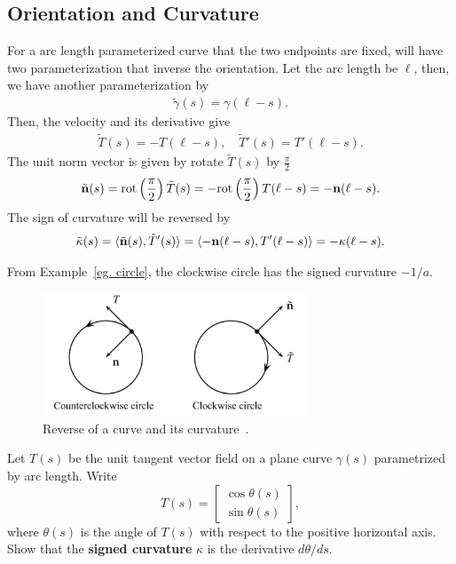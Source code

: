 \subsection{Orientation and Curvature}
For a arc length parameterized curve that the two endpoints are fixed, 
will have two parameterization that inverse the orientation. Let the arc length be $\ell$,
then, we have another parameterization by
\begin{align}
    \tilde{\gamma}(s)=\gamma(\ell - s). \nonumber
\end{align}
Then, the velocity and its derivative give
\begin{align}
    \tilde{T}(s)=-T(\ell - s), \quad \tilde{T}'(s)=T'(\ell - s). \nonumber
\end{align}
The unit norm vector is given by rotate $\tilde{T}(s)$ by $\frac{\pi}{2}$
\begin{align}
    \tilde{{\mathbf{n}}}(s)=\text{rot}\left(\frac{\pi}{2}\right)\tilde{T}(s)
    =-\text{rot}\left(\frac{\pi}{2}\right)T(\ell - s)=-{\mathbf{n}}(\ell - s). \nonumber
\end{align}
The sign of curvature will be reversed by
\begin{align}
    \tilde{\kappa}(s)=\langle \tilde{{\mathbf{n}}}(s), \tilde{T}'(s) \rangle
    =\langle -{\mathbf{n}}(\ell - s), T'(\ell - s) \rangle=-\kappa(\ell-s). \nonumber
\end{align}
\begin{example}
    From Example~\ref{eg. circle}, the clockwise circle has the signed curvature $-1/a$.
\end{example}
\begin{figure}[htb]
    \centering
    \includegraphics[width=0.7\textwidth]{../Lectures/Figures/reverse_orient.png}
    \caption{Reverse of a curve and its curvature~\cite[p.~13]{tuDifferentialGeometry2017}.}
\end{figure}
\begin{problem}
    Let $T(s)$ be the unit tangent vector field on a plane curve $\gamma(s)$ parametrized 
    by arc length. Write
\[
T(s) = \begin{bmatrix}
        \cos \theta(s) \\ 
        \sin \theta(s) 
        \end{bmatrix},
\]
where $\theta(s)$ is the angle of $T(s)$ with respect to the positive horizontal axis. 
Show that the \textbf{signed curvature} $\kappa$ is the derivative $d\theta/ds$.
\label{problem. 2.1}
\end{problem}

